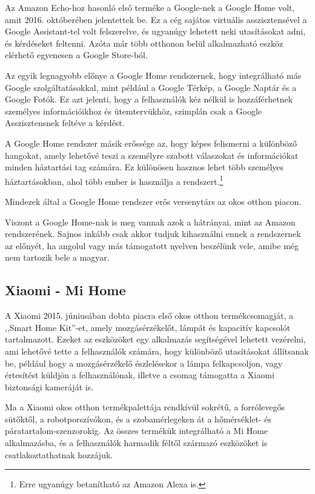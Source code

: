 \documentclass[
]{thesis-ekf}
\theoremstyle{definition}
\theoremstyle{remark}
\begin{document}
	Az Amazon Echo-hoz hasonló első terméke a Google-nek a Google Home volt, amit 2016. októberében jelentettek be. Ez a cég sajátos virtuális asszisztensével a Google Assistant-tel volt felszerelve, és ugyanúgy lehetett neki utasításokat adni, és kérdéseket feltenni. Azóta már több otthonon belül alkalmazható eszköz elérhető egyenesen a Google Store-ból.\cite{google-home-nest}
	
	Az egyik legnagyobb előnye a Google Home rendszernek, hogy integrálható más Google szolgáltatásokkal, mint például a Google Térkép, a Google Naptár és a Google Fotók. Ez azt jelenti, hogy a felhasználók kéz nélkül is hozzáférhetnek személyes információikhoz és ütemtervükhöz, szimplán csak a Google Asszisztensnek feltéve a kérdést.
	
	A Google Home rendszer másik erőssége az, hogy képes felismerni a különböző hangokat, amely lehetővé teszi a személyre szabott válaszokat és információkat minden háztartási tag számára. Ez különösen hasznos lehet több személyes háztartásokban, ahol több ember is használja a rendszert.\footnote{Erre ugyanúgy betanítható az Amazon Alexa is.}
	
 	Mindezek által a Google Home rendszer erős versenytárs az okos otthon piacon.
	
	Viszont a Google Home-nak is meg vannak azok a hátrányai, mint az Amazon rendszerének. Sajnos inkább csak akkor tudjuk kihasználni ennek a rendszernek az előnyét, ha angolul vagy más támogatott nyelven beszélünk vele, amibe még nem tartozik bele a magyar.
	
	\subsection{Xiaomi - Mi Home}
	A Xiaomi 2015. júniusában dobta piacra első okos otthon termékcsomagját, a ,,Smart Home Kit''-et, amely mozgásérzékelőt, lámpát és kapacitív kapcsolót tartalmazott. Ezeket az eszközöket egy alkalmazás segítségével lehetett vezérelni, ami lehetővé tette a felhasználók számára, hogy különböző utasításokat állítsanak be, például hogy a mozgásérzékelő észlelésekor a lámpa felkapcsoljon, vagy értesítést küldjön a felhasználónak, illetve a csomag támogatta a Xiaomi biztonsági kameráját is. \cite{xiaomi-home}
	
	Ma a Xiaomi okos otthon termékpalettája rendkívül sokrétű, a forrólevegős sütőktől, a robotporszívókon, és a szobamérlegeken át a hőmérséklet- és páratartalom-szenzorokig. Az összes termékük integrálható a Mi Home alkalmazásba, és a felhasználók harmadik féltől származó eszközöket is csatlakoztathatnak hozzájuk.
	
\end{document}
